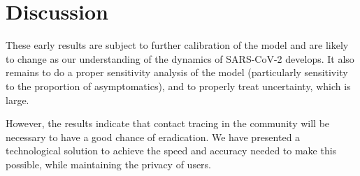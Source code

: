 \documentclass{article}
\begin{document}
\section{Discussion}

These early results are subject to further calibration of the model and are likely to change as our understanding of the dynamics of SARS-CoV-2 develops. It also remains to do a proper sensitivity analysis of the model (particularly sensitivity to the proportion of asymptomatics), and to properly treat uncertainty, which is large.

However, the results indicate that contact tracing in the community will be necessary to have a good chance of eradication. We have presented a technological solution to achieve the speed and accuracy needed to make this possible, while maintaining the privacy of users.

%
% 


\end{document}
